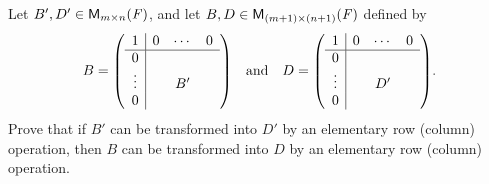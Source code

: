 \begin{ex}\label{ex:3.2.12}
  Let \(B', D' \in \mathsf{M}_{{m} \times n}({\mathit{F}})\), and let \(B, D \in \mathsf{M}_{{(m + 1)} \times (n + 1)}({\mathit{F}})\) defined by
  \[
    B = \pa{\begin{array}{c|ccc}
        1      & 0 & \cdots & 0 \\
        \hline
        0      &   &        &   \\
        \vdots &   & B'     &   \\
        0      &   &        &
      \end{array}} \quad \text{and} \quad D = \pa{\begin{array}{c|ccc}
        1      & 0 & \cdots & 0 \\
        \hline
        0      &   &        &   \\
        \vdots &   & D'     &   \\
        0      &   &        &
      \end{array}}.
  \]
  Prove that if \(B'\) can be transformed into \(D'\) by an elementary row (column) operation, then \(B\) can be transformed into \(D\) by an elementary row (column) operation.
\end{ex}

